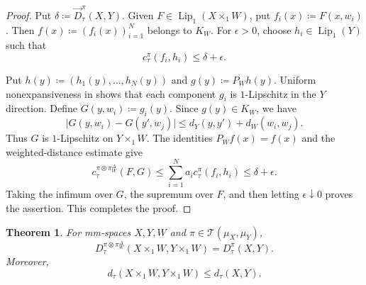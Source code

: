 \documentclass[10pt,a4paper]{amsart}
\newtheorem{theorem}{Theorem}[section]
\newcommand{\T}{\mathcal T}
\newcommand{\dtau}{d_{\tau}}
\begin{document}
\begin{proof}
Put $\delta\coloneqq\overrightarrow D_\tau^\pi(X,Y)$. Given $F\in\operatorname{Lip}_1(X\times_1W)$, put $f_i(x)\coloneqq F(x,w_i)$. Then $f(x)\coloneqq(f_i(x))_{i=1}^N$ belongs to $K_W$. For $\epsilon>0$, choose $h_i\in\operatorname{Lip}_1(Y)$ such that
\[
c_\tau^\pi(f_i,h_i)\leq\delta+\epsilon.
\]

Put $h(y)\coloneqq(h_1(y),\ldots,h_N(y))$ and $g(y)\coloneqq P_Wh(y)$. Uniform nonexpansiveness in  shows that each component $g_i$ is $1$-Lipschitz in the $Y$ direction. Define $G(y,w_i)\coloneqq g_i(y)$. Since $g(y)\in K_W$, we have
\[
\lvert G(y,w_i)-G(y',w_j)\rvert
\leq d_Y(y,y')+d_W(w_i,w_j).
\]
Thus $G$ is $1$-Lipschitz on $Y\times_1W$. The identities $P_Wf(x)=f(x)$ and the weighted-distance estimate give
\[
c_\tau^{\pi\otimes\pi_W^\Delta}(F,G)\leq\sum_{i=1}^Na_i c_\tau^\pi(f_i,h_i)\leq\delta+\epsilon.
\]
Taking the infimum over $G$, the supremum over $F$, and then letting $\epsilon\downarrow0$ proves the assertion. This completes the proof.
\end{proof}

\begin{theorem}
\label{thm:tau-tensorization}
For mm-spaces $X,Y,W$ and $\pi\in\T(\mu_X,\mu_Y)$,
\[
D_\tau^{\pi\otimes\pi_W^\Delta}(X\times_1W,Y\times_1W)=D_\tau^\pi(X,Y).
\]
Moreover,
\[
\dtau(X\times_1W,Y\times_1W)\leq\dtau(X,Y).
\]
\end{theorem}
\end{document}
